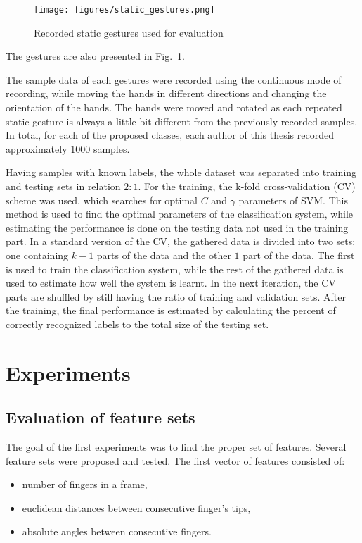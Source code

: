 \begin{figure}[htb]
\centering
 \texttt{[image: figures/static\_gestures.png]}
 \caption{Recorded static gestures used for evaluation}
 \label{staticgesturesdata}
\end{figure}
The gestures are also presented in Fig.~\ref{staticgesturesdata}.

The sample data of each gestures were recorded using the continuous mode of recording, while moving the hands in different directions and changing the orientation of the hands.
The hands were moved and rotated as each repeated static gesture is always a little bit different from the previously recorded samples.
In total, for each of the proposed classes, each author of this thesis recorded approximately 1000 samples.

Having samples with known labels, the whole dataset was separated into training and testing sets in relation $2:1$. 
For the training, the k-fold cross-validation (CV) scheme was used, which searches for optimal $C$ and $\gamma$ parameters of SVM.
This method is used to find the optimal parameters of the classification system, while estimating the performance is done on the testing data not used in the training part. 
In a standard version of the CV, the gathered data is divided into two sets: one containing $k-1$ parts of the data and the other $1$ part of the data. 
The first is used to train the classification system, while the rest of the gathered data is used to estimate how well the system is learnt.
In the next iteration, the CV parts are shuffled by still having the ratio of training and validation sets.
After the training, the final performance is estimated by calculating the percent of correctly recognized labels to the total size of the testing set.


\section{Experiments}
\label{static:exp}

\subsection{Evaluation of feature sets}

The goal of the first experiments was to find the proper set of features. Several feature sets were proposed and tested. The first vector of features consisted of:
\begin{itemize}
\item number of fingers in a frame,
\item euclidean distances between consecutive finger's tips,
\item absolute angles between consecutive fingers.
\end{itemize} 

